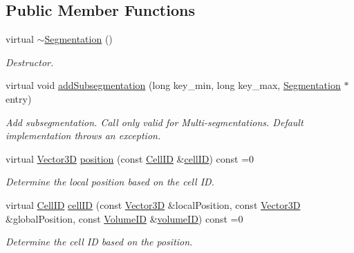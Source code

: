 \subsection*{Public Member Functions}
\begin{DoxyCompactItemize}
\item 
virtual \hyperlink{class_d_d4hep_1_1_d_d_segmentation_1_1_segmentation_a2865f0e68cb2ecfb5717584e67be4228}{$\sim$\+Segmentation} ()
\begin{DoxyCompactList}\small\item\em Destructor. \end{DoxyCompactList}\item 
virtual void \hyperlink{class_d_d4hep_1_1_d_d_segmentation_1_1_segmentation_a881469fb51d55c2119e0a94672cb62da}{add\+Subsegmentation} (long key\+\_\+min, long key\+\_\+max, \hyperlink{class_d_d4hep_1_1_d_d_segmentation_1_1_segmentation}{Segmentation} $\ast$entry)
\begin{DoxyCompactList}\small\item\em Add subsegmentation. Call only valid for Multi-\/segmentations. Default implementation throws an exception. \end{DoxyCompactList}\item 
virtual \hyperlink{struct_d_d4hep_1_1_d_d_segmentation_1_1_vector3_d}{Vector3D} \hyperlink{class_d_d4hep_1_1_d_d_segmentation_1_1_segmentation_a594fe6d78667415855858d083b64acad}{position} (const \hyperlink{namespace_d_d4hep_1_1_d_d_segmentation_ac7af071d85cb48820914434a07e21ba1}{Cell\+ID} \&\hyperlink{class_d_d4hep_1_1_d_d_segmentation_1_1_segmentation_ad5a60953d96d409850d8192f64f8ce3c}{cell\+ID}) const =0
\begin{DoxyCompactList}\small\item\em Determine the local position based on the cell ID. \end{DoxyCompactList}\item 
virtual \hyperlink{namespace_d_d4hep_1_1_d_d_segmentation_ac7af071d85cb48820914434a07e21ba1}{Cell\+ID} \hyperlink{class_d_d4hep_1_1_d_d_segmentation_1_1_segmentation_ad5a60953d96d409850d8192f64f8ce3c}{cell\+ID} (const \hyperlink{struct_d_d4hep_1_1_d_d_segmentation_1_1_vector3_d}{Vector3D} \&local\+Position, const \hyperlink{struct_d_d4hep_1_1_d_d_segmentation_1_1_vector3_d}{Vector3D} \&global\+Position, const \hyperlink{namespace_d_d4hep_1_1_d_d_segmentation_a61a6833a18d1800bdef176595f83e3ba}{Volume\+ID} \&\hyperlink{class_d_d4hep_1_1_d_d_segmentation_1_1_segmentation_a43c0e9648e3b7cded015847c0802f757}{volume\+ID}) const =0
\begin{DoxyCompactList}\small\item\em Determine the cell ID based on the position. \end{DoxyCompactList}\item 

\end{DoxyCompactItemize}
